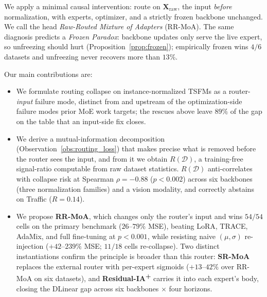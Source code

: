 \documentclass{article}
\begin{document}
We apply a minimal causal intervention: route on $\mathbf{X}_\text{raw}$, the input \emph{before} normalization, with experts, optimizer, and a strictly frozen backbone unchanged. We call the head \emph{Raw-Routed Mixture of Adapters} (RR-MoA). The same diagnosis predicts a \emph{Frozen Paradox}: backbone updates only serve the live expert, so unfreezing should hurt (Proposition~\ref{prop:frozen}); empirically frozen wins $4/6$ datasets and unfreezing never recovers more than $13\%$.

Our main contributions are:
\begin{itemize}[leftmargin=1.2em, itemsep=0.15em, topsep=0.2em]
\item We formulate routing collapse on instance-normalized TSFMs as a router-\emph{input} failure mode, distinct from and upstream of the optimization-side failure modes prior MoE work targets; the rescues above leave $89\%$ of the gap on the table that an input-side fix closes.
\item We derive a mutual-information decomposition (Observation~\ref{obs:routing_loss}) that makes precise what is removed before the router sees the input, and from it we obtain $R(\mathcal{D})$, a training-free signal-ratio computable from raw dataset statistics. $R(\mathcal{D})$ anti-correlates with collapse risk at Spearman $\rho{=}{-}0.88$ ($p{<}0.002$) across six backbones (three normalization families) and a vision modality, and correctly abstains on Traffic ($R{=}0.14$).
\item We propose \textbf{RR-MoA}, which changes only the router's input and wins $54/54$ cells on the primary benchmark ($26$--$79\%$ MSE), beating LoRA, TRACE, AdaMix, and full fine-tuning at $p{<}0.001$, while resisting naive $(\mu,\sigma)$ re-injection ($+42$--$239\%$ MSE; $11/18$ cells re-collapse). Two distinct instantiations confirm the principle is broader than this router: \textbf{SR-MoA} replaces the external router with per-expert sigmoids ($+13$--$42\%$ over RR-MoA on six datasets), and \textbf{Residual-IA\textsuperscript{+}} carries it into each expert's body, closing the DLinear gap across six backbones $\times$ four horizons.
\end{itemize}
\end{document}
